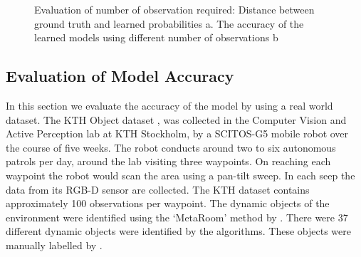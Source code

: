\begin{figure}
\begin{subfigure}[b]{0.4\textwidth}
        \caption{}
        \label{fig:object_simulation_accuracy}
    \end{subfigure}
    \caption[Evaluation of number of observation required]{Evaluation of number of observation required: Distance between ground truth and learned probabilities a. The accuracy of the learned models using different number of observations b }\label{fig:object_simulation_accuracy}
\end{figure}

\FloatBarrier
\subsection{Evaluation of Model Accuracy}

In this section we evaluate the accuracy of the model by using a real world dataset. The KTH Object dataset \cite{krajnik_wheres_2015}, was collected in the Computer Vision and Active Perception lab at KTH Stockholm, by a SCITOS-G5 mobile robot over  the  course  of  five  weeks.  The robot conducts around two to six autonomous patrols per day, around the lab visiting three waypoints. On reaching each waypoint the robot would scan the area using a pan-tilt sweep. In each seep the data from its RGB-D sensor are collected. The KTH dataset contains approximately 100 observations per waypoint. The dynamic objects of the environment were identified  using the `MetaRoom' method by \cite{ambrucs2014meta}. There were 37 different dynamic objects were identified by the algorithms. These objects were manually labelled by \cite{krajnik_wheres_2015}.

